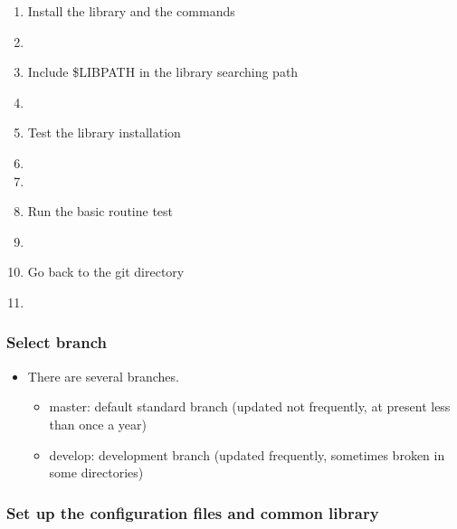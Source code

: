 \documentclass[11pt]{article}
\begin{document}
\begin{enumerate}
\item
Install the library and the commands
\item[\qquad]
\item
Include \$LIBPATH in the library searching path
\item[\qquad]
\item
Test the library installation
\item[\qquad]
\item[\qquad]
\item
Run the basic routine test
\item[\qquad]
\item
Go back to the git directory
\item[\qquad]
\end{enumerate}

\subsubsection{Select branch}

\begin{itemize}
\item
  There are several branches.
  \begin{itemize}
  \item
    master: default standard branch (updated not frequently, at present
    less than once a year)
  \item
    develop: development branch (updated frequently, sometimes broken
    in some directories)
  \end{itemize}
\end{itemize}

\subsubsection{Set up the configuration files and common library}
\end{document}
